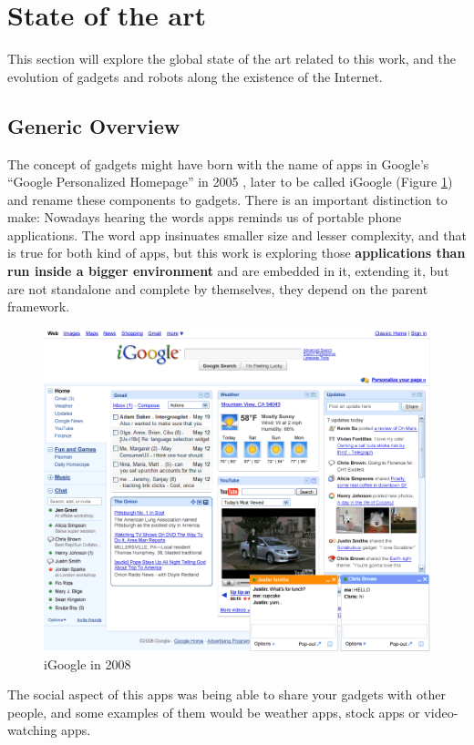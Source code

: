 \newpage
\thispagestyle{sectioned}
\section{State of the art}
This section will explore the global state of the art related to this work, and the evolution of gadgets and robots along the existence of the Internet.
\subsection{Generic Overview}
The concept of gadgets might have born with the name of apps in Google's ``Google Personalized Homepage'' in 2005 \cite{ref:what_happened_to_igoogle}, later to be called iGoogle (Figure \ref{fig:igoogle_2008}) and rename these components to gadgets. There is an important distinction to make: Nowadays hearing the words apps reminds us of portable phone applications. The word app insinuates smaller size and lesser complexity, and that is true for both kind of apps, but this work is exploring those \textbf{applications than run inside a bigger environment} and are embedded in it, extending it, but are not standalone and complete by themselves, they depend on the parent framework.
\begin{figure}[H]
  \center
    \includegraphics[keepaspectratio, scale=0.6]{Media/Captures/Soa/iGoogle.png}
  \caption{iGoogle in 2008}
  \label{fig:igoogle_2008}
\end{figure}
The social aspect of this apps was being able to share your gadgets with other people, and some examples of them would be weather apps, stock apps or video-watching apps.\\[.2cm]
